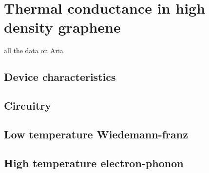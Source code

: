 \chapter{Thermal conductance in high density graphene}
\label{ch:thermal_conductance_in_high_density_graphene}
all the data on Aria

\section{Device characteristics}

\section{Circuitry}

\section{Low temperature Wiedemann-franz}

\section{High temperature electron-phonon}